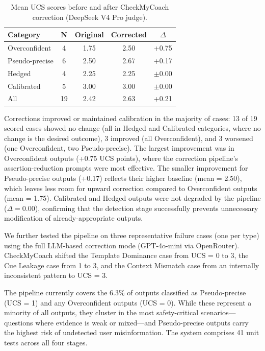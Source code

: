 \documentclass[manuscript, review, anonymous]{acmart}
\begin{document}
\begin{table}[ht]
\centering
\caption{Mean UCS scores before and after CheckMyCoach correction (DeepSeek V4 Pro judge).}
\label{tab:baseline}
\begin{tabular}{lcccc}
\toprule
Category & N & Original & Corrected & $\Delta$ \\
\midrule
Overconfident      & 4 & 1.75 & 2.50 & +0.75 \\
Pseudo-precise     & 6 & 2.50 & 2.67 & +0.17 \\
Hedged             & 4 & 2.25 & 2.25 & $\pm$0.00 \\
Calibrated         & 5 & 3.00 & 3.00 & $\pm$0.00 \\
\midrule
All                & 19 & 2.42 & 2.63 & +0.21 \\
\bottomrule
\end{tabular}
\end{table}

Corrections improved or maintained calibration in the majority of cases: 13 of 19 scored cases showed no change (all in Hedged and Calibrated categories, where no change is the desired outcome), 3 improved (all Overconfident), and 3 worsened (one Overconfident, two Pseudo-precise). The largest improvement was in Overconfident outputs (+0.75 UCS points), where the correction pipeline's assertion-reduction prompts were most effective. The smaller improvement for Pseudo-precise outputs (+0.17) reflects their higher baseline (mean = 2.50), which leaves less room for upward correction compared to Overconfident outputs (mean = 1.75). Calibrated and Hedged outputs were not degraded by the pipeline ($\Delta = 0.00$), confirming that the detection stage successfully prevents unnecessary modification of already-appropriate outputs.

We further tested the pipeline on three representative failure cases (one per type) using the full LLM-based correction mode (GPT-4o-mini via OpenRouter). CheckMyCoach shifted the Template Dominance case from UCS = 0 to 3, the Cue Leakage case from 1 to 3, and the Context Mismatch case from an internally inconsistent pattern to UCS = 3.

The pipeline currently covers the 6.3\% of outputs classified as Pseudo-precise (UCS = 1) and any Overconfident outputs (UCS = 0). While these represent a minority of all outputs, they cluster in the most safety-critical scenarios---questions where evidence is weak or mixed---and Pseudo-precise outputs carry the highest risk of undetected user misinformation. The system comprises 41 unit tests across all four stages.
\end{document}
